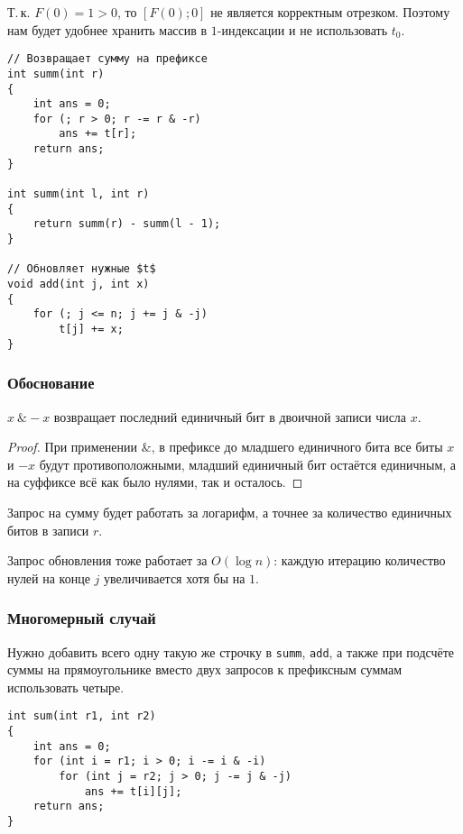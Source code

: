 Т.\,к. $F(0) = 1 > 0$, то $[F(0); 0]$ не является корректным отрезком. Поэтому нам будет удобнее хранить массив в $1$-индексации и не использовать $t_0$.

\begin{verbatim}
// Возвращает сумму на префиксе
int summ(int r)
{
    int ans = 0;
    for (; r > 0; r -= r & -r)
        ans += t[r];
    return ans;
}

int summ(int l, int r)
{
    return summ(r) - summ(l - 1);
}

// Обновляет нужные $t$
void add(int j, int x)
{
    for (; j <= n; j += j & -j)
        t[j] += x;
}
\end{verbatim}

\subsubsection{Обоснование}

\begin{lemma}
    $x\:\&-x$ возвращает последний единичный бит в двоичной записи числа $x$.
\end{lemma}

\begin{proof}
    При применении $\&$, в префиксе до младшего единичного бита все биты $x$ и $-x$ будут противоположными, младший единичный бит остаётся единичным, а на суффиксе всё как было нулями, так и осталось.
\end{proof}

\begin{corollary}
    Запрос на сумму будет работать за логарифм, а точнее за количество единичных битов в записи $r$.
\end{corollary}

\begin{corollary}
    Запрос обновления тоже работает за $O(\log n)$: каждую итерацию количество нулей на конце $j$ увеличивается хотя бы на $1$.
\end{corollary}

\subsubsection{Многомерный случай}

Нужно добавить всего одну такую же строчку в \texttt{summ}, \texttt{add}, а также при подсчёте суммы на прямоугольнике вместо двух запросов к префиксным суммам использовать четыре.

\begin{verbatim}
int sum(int r1, int r2)
{
    int ans = 0;
    for (int i = r1; i > 0; i -= i & -i)
        for (int j = r2; j > 0; j -= j & -j)
            ans += t[i][j];
    return ans;
}
\end{verbatim}

